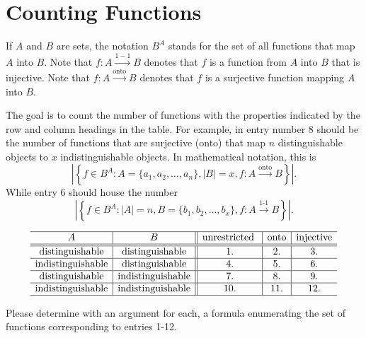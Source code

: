 \documentclass[answers]{exam}
\begin{document}
		\section{Counting Functions}
			\begin{questions}
			\question If $A$ and $B$ are sets, the notation $B^A$ stands for the set of all functions that map $A$ into $B$.
				Note that $f:A \stackrel{1-1}{\longrightarrow} B$ denotes that $f$ is a function from $A$ into $B$ that is injective.
				Note that $f:A \stackrel{\mbox{onto}}{\longrightarrow} B$ denotes that $f$ is a surjective function mapping $A$ into $B$.
				
				The goal is to count the number of functions with the properties indicated by the row and column headings in the table.
				For example, in entry number $8$ should be the number of functions that are surjective (onto) that map $n$ distinguishable objects to $x$ indistinguishable objects.
				In mathematical notation, this is
				$$\left|\left\{f \in B^A : A=\{a_1,a_2, \dots, a_n\}, |B| = x, f:A \stackrel{\mbox{onto}}{\longrightarrow} B  \right\} \right|.$$
				While entry $6$ should house the number
				$$\left|\left\{f \in B^A : |A|=n, B =\{b_1,b_2, \dots, b_x\}, f:A \stackrel{\mbox{1-1}}{\longrightarrow} B  \right\} \right|.$$
				
				
				\[\begin{array}{c|c||c|c|c}
					\hline A & B & \mbox{unrestricted }& \mbox{onto}& \mbox{injective} \\ \hline \hline
					\mbox{distinguishable} & \mbox{distinguishable} & 1. & 2. & 3. \\ \hline
					\mbox{indistinguishable}& \mbox{distinguishable}&4.&5.&6. \\ \hline
					\mbox{distinguishable} & \mbox{indistinguishable}& 7. & 8. & 9. \\ \hline
					\mbox{indistinguishable}&\mbox{indistinguishable}& 10. &11.&12. \\ \hline 
				\end{array}\]
				
				\noindent Please determine with an argument for each, a formula enumerating the set of functions corresponding to entries 1-12. 
			\end{questions}
		
\end{document}
